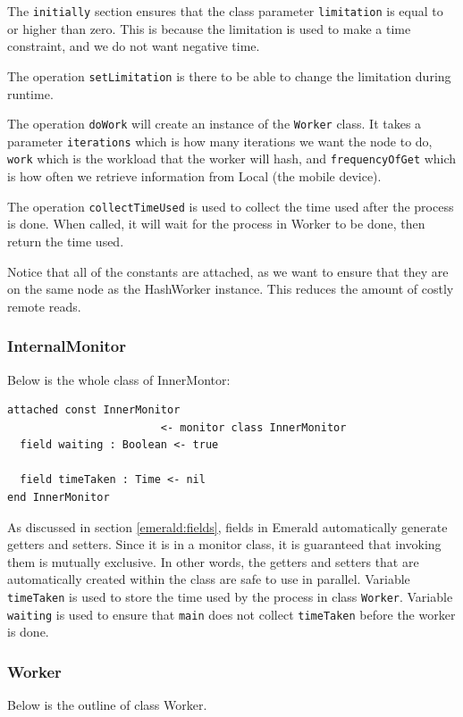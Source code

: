 The \verb|initially| section ensures that the class parameter \verb|limitation| is equal to or higher than zero. This is because the limitation is used to make a time constraint, and we do not want negative time.

The operation \verb|setLimitation| is there to be able to change the limitation during runtime.

The operation \verb|doWork| will create an instance of the \verb|Worker| class. It takes a parameter \verb|iterations| which is how many iterations we want the node to do, \verb|work| which is the workload that the worker will hash, and \verb|frequencyOfGet| which is how often we retrieve information from Local (the mobile device). 

The operation \verb|collectTimeUsed| is used to collect the time used after the process is done. When called, it will wait for the process in Worker to be done, then return the time used.

Notice that all of the constants are attached, as we want to ensure that they are on the same node as the HashWorker instance. This reduces the amount of costly remote reads.




\subsubsection{InternalMonitor}
Below is the whole class of InnerMontor:
\begin{lstlisting}[language=emerald]
attached const InnerMonitor 
                        <- monitor class InnerMonitor
  field waiting : Boolean <- true

  field timeTaken : Time <- nil
end InnerMonitor
\end{lstlisting}
As discussed in section \ref{emerald:fields}, fields in Emerald automatically generate getters and setters. Since it is in a monitor class, it is guaranteed that invoking them is mutually exclusive. In other words, the getters and setters that are automatically created within the class are safe to use in parallel. Variable \verb|timeTaken| is used to store the time used by the process in class \verb|Worker|. Variable \verb|waiting| is used to ensure that \verb|main| does not collect \verb|timeTaken| before the worker is done. 





\subsubsection{Worker}
Below is the outline of class Worker.


